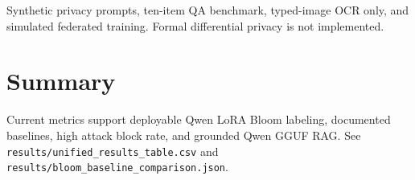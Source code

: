 Synthetic privacy prompts, ten-item QA benchmark, typed-image OCR only, and simulated federated training. Formal differential privacy is not implemented.

\section{Summary}

Current metrics support deployable Qwen LoRA Bloom labeling, documented baselines, high attack block rate, and grounded Qwen GGUF RAG. See \texttt{results/unified\_results\_table.csv} and \texttt{results/bloom\_baseline\_comparison.json}.
